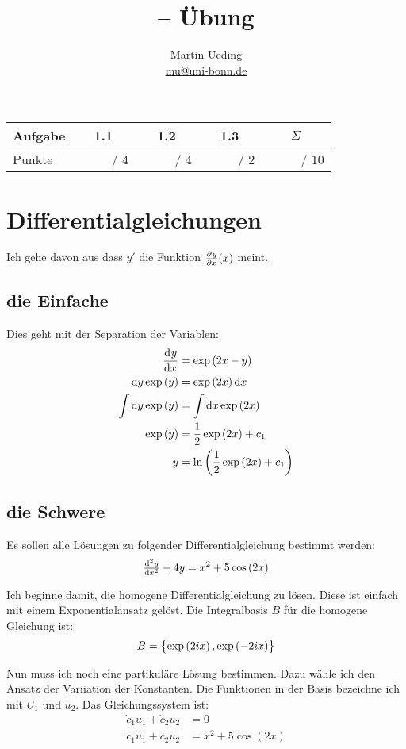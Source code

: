 \documentclass[11pt, ngerman]{article}
\title{\themodul{} -- Übung \theuebung \\ \vspace{0.5cm} \large{\thegruppe}}
\author{Martin Ueding \\ \small{\href{mailto:mu@uni-bonn.de}{mu@uni-bonn.de}}}
\newcommand{\punkte}{\textcolor{white}{xxxxx}}
\begin{document}
\maketitle

\begin{table}[h]
	\centering
	\begin{tabular}{l|c|c|c|c}
		Aufgabe & 1.1 & 1.2 & 1.3 & $\Sigma$   \\
		\hline
		Punkte & \punkte / 4 & \punkte / 4 & \punkte / 2 & \punkte / 10
	\end{tabular}
\end{table}

\section{Differentialgleichungen}

Ich gehe davon aus dass $y'$ die Funktion $\pd yx(x)$ meint.

\subsection{die Einfache}

Dies geht mit der Separation der Variablen:
%
\begin{align*}
	\dod yx &= \exp\del{2x-y} \\
	\dif y \exp\del y &= \exp\del{2x} \dif x \\
	\int \dif y \exp \del y &= \int \dif x \exp\del{2x} \\
	\exp\del y &= \frac 12 \exp\del{2x} + c_1 \\
			 y &= \ln\del{\frac 12 \exp\del{2x} + c_1}
\end{align*}


\subsection{die Schwere}

Es sollen alle Lösungen zu folgender Differentialgleichung bestimmt werden:
\[
	\od[2] yx + 4y = x^2 + 5 \cos\del{2x}
\]

\newcommand\ex{\exp\del{2ix}}

Ich beginne damit, die homogene Differentialgleichung zu lösen. Diese ist
einfach mit einem Exponentialansatz gelöst. Die Integralbasis $B$ für die
homogene Gleichung ist:
\[
	B = \set{\ex, \exp\del{-2ix}}
\]

Nun muss ich noch eine partikuläre Lösung bestimmen. Dazu wähle ich den Ansatz
der Variiation der Konstanten. Die Funktionen in der Basis bezeichne ich mit
$U_1$ und $u_2$. Das Gleichungssystem ist:
\begin{align*}
	\dot c_1 u_1 + \dot c_2 u_2 &= 0 \\
	\dot c_1 \dot u_1 + \dot c_2 \dot u_2 &= x^2 + 5 \cos(2x)
\end{align*}
\end{document}
